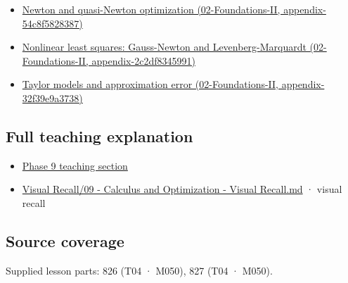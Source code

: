 \begin{itemize}
\tightlist
\item
  \href{}{Newton and quasi-Newton optimization (02-Foundations-II, appendix-54c8f5828387)}
\item
  \href{}{Nonlinear least squares: Gauss-Newton and Levenberg-Marquardt (02-Foundations-II, appendix-2c2df8345991)}
\item
  \href{}{Taylor models and approximation error (02-Foundations-II, appendix-32f39e9a3738)}
\end{itemize}

\subsection{Full teaching explanation}\label{full-teaching-explanation}

\begin{itemize}
\tightlist
\item
  \href{Continuous\%20Notes/Computing\%20Foundations\%20-\%20From\%20Bits\%20to\%20C++\%20and\%20Systems\%20APIs\#Jacobians,\%20curvature,\%20and\%20local\%20approximation}{Phase 9 teaching section}
\item
  \hyperref[appendix-adf48f5dc5c1]{Visual Recall/09 - Calculus and Optimization - Visual Recall.md} · visual recall
\end{itemize}

\subsection{Source coverage}\label{source-coverage}

Supplied lesson parts: 826 (T04 · M050), 827 (T04 · M050).
